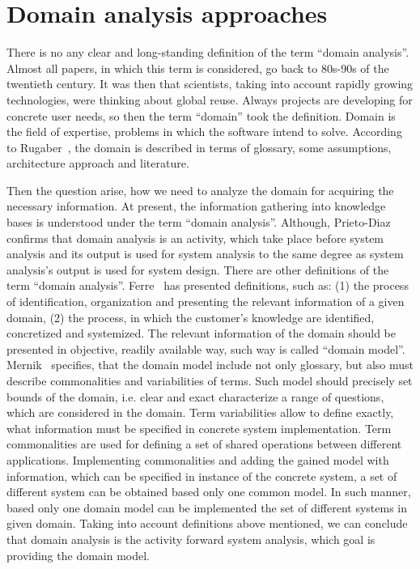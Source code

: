 \documentclass[conference]{IEEEtran}
\begin{document}
\section{Domain analysis approaches}
\label{chapter:approaches}
There is no any clear and long-standing definition of the term ``domain analysis''. Almost all papers, in which this term is considered, go back to 80s-90s of the twentieth century. It was then that scientists, taking into account rapidly growing technologies, were thinking about global reuse. Always projects are developing for concrete user needs, so then the term ``domain'' took the definition. Domain is the field of expertise, problems in which the software intend to solve. According to Rugaber~\cite{rugaber1994domain}, the domain is described in terms of glossary, some assumptions, architecture approach and literature. 

Then the question arise, how we need to analyze the domain for acquiring the necessary information. At present, the information gathering into knowledge bases is understood under the term ``domain analysis''. Although, Prieto-Diaz~\cite{prieto1988domain} confirms that domain analysis is an activity, which take place before system analysis and its output is used for system analysis to the same degree as system analysis’s output is used for system design.  There are other definitions of the term ``domain analysis''. Ferre~\cite{ferre1999evaluation} has presented definitions, such as: (1) the process of identification, organization and presenting the relevant information of a given domain, (2) the process, in which the customer’s knowledge are identified, concretized and systemized. The relevant information of the domain should be presented in objective, readily available way, such way is called ``domain model''. Mernik~\cite{mernik2005} specifies, that the domain model include not only glossary, but also must describe commonalities and variabilities of terms. Such model should precisely set bounds of the domain, i.e. clear and exact characterize a range of questions, which are considered in the domain. Term variabilities allow to define exactly, what information must be specified in concrete system implementation. Term commonalities are used for defining a set of shared operations between different applications. Implementing commonalities and adding the gained model  with information, which can be specified in instance of the concrete system, a set of different system can be obtained based only one common model. In such manner, based only one domain model can be implemented the set of different systems in given domain. Taking into account definitions above mentioned, we can conclude that domain analysis is the activity forward system analysis, which goal is providing the domain model. 
\end{document}
